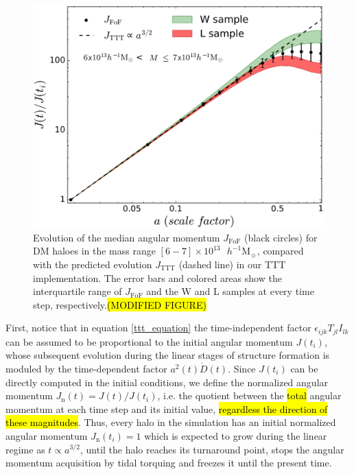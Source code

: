 \documentclass[fleqn,usenatbib]{mnras}
\newcommand{\hMsun}{{\textrm{ $h^{-1}$M$_{\sun}$}}}
\newcommand{\Wh}{\mathrm{W}}
\newcommand{\Lh}{\mathrm{L}}
\begin{document}
\begin{figure}
	\includegraphics[width=\columnwidth]{400Mpc_figs/J_median_6-7e13.pdf}
    \caption{Evolution of the median angular momentum $J_\mathrm{FoF}$ (black circles) for DM haloes in the mass range $[6-7]\times 10^{13}\hMsun$, compared with the predicted evolution $J_\mathrm{TTT}$ (dashed line) in our TTT implementation. The error bars and colored areas show the interquartile range of $J_\mathrm{FoF}$ and the $\Wh$ and $\Lh$ samples at every time step, respectively.\hl{(MODIFIED FIGURE)}}
    \label{fig:J_median}
\end{figure}

First, notice that in equation \eqref{ttt_equation} the time-independent factor $\epsilon_{ijk}T_{jl}I_{lk}$ can be assumed to be proportional to the initial angular momentum $J(t_i)$, whose subsequent evolution during the linear stages of structure formation is moduled by the time-dependent factor $a^2(t)\dot{D}(t)$. Since $J(t_i)$ can be directly computed in the initial conditions, we define the {normalized angular momentum} $J_\mathrm{n}(t)=J(t)/J(t_i)$, i.e. the quotient between the \hl{total} angular momentum at each time step and its initial value, \hl{regardless the direction of these magnitudes}. Thus, every halo in the simulation has an initial normalized angular momentum $J_\mathrm{n}(t_i)=1$ which is expected to grow during the linear regime as $t\propto a^{3/2}$, until the halo reaches its turnaround point, stops the angular momentum acquisition by tidal torquing and freezes it until the present time.
\end{document}
